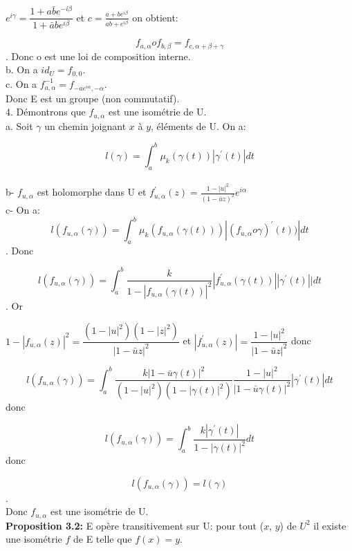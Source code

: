 \documentclass[a4paper, 12pt, twoside]{book}
\begin{document}
   $e^{i\gamma}=\dfrac{1+a\bar{b}e^{-i\beta}}{1+\bar{a}be^{i\beta}}$ et $c=\frac{a+be^{i\beta}}{a\bar{b}+e^{i\beta}}$ on obtient:\
   
   $$f_{a,\alpha}of_{b,\beta}=f_{c, \alpha+\beta+\gamma}$$. Donc o est une loi de composition interne.\\
   
   
  b. On a $id_{U}=f_{0, 0}$.\\
  
  
  c. On a $f^{-1}_{a, \alpha}=f_{-ae^{i\alpha}, -\alpha} $.\\
  
  Donc E est un groupe (non commutatif).\\
  
  4. Démontrons que $f_{u, \alpha}$ est une isométrie de U.\\
  
  a. Soit $\gamma$ un chemin joignant $x$ à $y$, éléments de U. On a:\
  
  $$l(\gamma)=\int_{a}^{b}  \mu_{k}(\gamma(t))|\gamma^{'}(t)|dt$$\\
  
   
  b- $f_{u, \alpha}$ est holomorphe dans U et $f_{u, \alpha}^{'}(z)=\frac{1-|u|^{2}}{(1-\bar{u}z)^{2}}e^{i\alpha}$\\
  
  
   c- On a:  $$l(f_{u, \alpha}(\gamma))=\int_{a}^{b}  \mu_{k}(f_{u, \alpha}(\gamma(t)))|(f_{u, \alpha}o\gamma)^{'}(t))|dt$$. Donc\
  
  $$l(f_{u, \alpha}(\gamma))=\int_{a}^{b}  \dfrac{k}{1-|f_{u, \alpha}(\gamma(t))|^{2}}|f_{u, \alpha}^{'}(\gamma(t))||\gamma^{'}(t)| 
 |dt$$. Or \
 
 $1-|f_{u, \alpha}(z)|^{2}=\dfrac{(1-|u|^{2})(1-|z|^{2})}{|1-\bar{u}z|^{2}}$ et   $|f_{u, \alpha}^{'}(z)|=\dfrac{1-|u|^{2}}{|1-\bar{u}z|^{2}}$ donc \
 
$$l(f_{u, \alpha}(\gamma))=\int_{a}^{b}  \dfrac{k|1-\bar{u}\gamma(t)|^{2}}{(1-|u|^{2})(1-|\gamma(t)|^{2})}\dfrac{1-|u|^{2}}{|1-\bar{u}\gamma(t)|^{2}}|\gamma^{'}(t)|dt$$ donc\

$$l(f_{u, \alpha}(\gamma))=\int_{a}^{b}  \dfrac{k|\gamma^{'}(t)|}{1-|\gamma(t)|^{2}}dt$$ donc \

 $$l(f_{u, \alpha}(\gamma))=l(\gamma)$$.\\
 
 Donc $f_{u,\alpha}$ est une isométrie de U.\\
 
 \textbf{Proposition 3.2:} E opère transitivement sur U: pour tout ($x$, $y$) de $U^{2}$ il existe une isométrie $f$ de E telle que $f(x)=y$.\\
 
\end{document}
